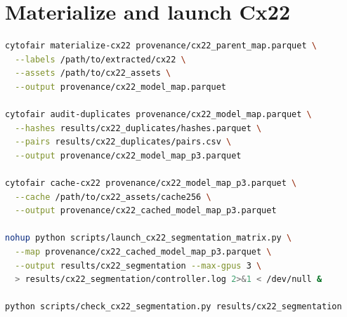 \section{Materialize and launch Cx22}

\begin{lstlisting}[style=cyto,language=bash]
cytofair materialize-cx22 provenance/cx22_parent_map.parquet \
  --labels /path/to/extracted/cx22 \
  --assets /path/to/cx22_assets \
  --output provenance/cx22_model_map.parquet

cytofair audit-duplicates provenance/cx22_model_map.parquet \
  --hashes results/cx22_duplicates/hashes.parquet \
  --pairs results/cx22_duplicates/pairs.csv \
  --output provenance/cx22_model_map_p3.parquet

cytofair cache-cx22 provenance/cx22_model_map_p3.parquet \
  --cache /path/to/cx22_assets/cache256 \
  --output provenance/cx22_cached_model_map_p3.parquet

nohup python scripts/launch_cx22_segmentation_matrix.py \
  --map provenance/cx22_cached_model_map_p3.parquet \
  --output results/cx22_segmentation --max-gpus 3 \
  > results/cx22_segmentation/controller.log 2>&1 < /dev/null &

python scripts/check_cx22_segmentation.py results/cx22_segmentation
\end{lstlisting}
